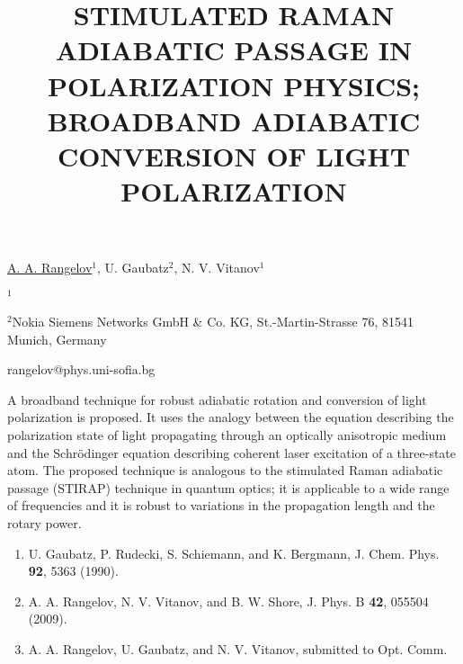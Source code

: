 \title{STIMULATED RAMAN ADIABATIC PASSAGE IN POLARIZATION PHYSICS; BROADBAND ADIABATIC CONVERSION OF LIGHT POLARIZATION}

\underline{A. A. Rangelov}$^{1}$, U. Gaubatz$^{2}$, N. V.
Vitanov$^{1}$  

{\normalsize{

\vspace{-4mm} $^1$\unisofia

\vspace{-4mm} $^2$Nokia Siemens Networks GmbH \& Co. KG,
St.-Martin-Strasse 76, 81541 Munich, Germany

\email rangelov@phys.uni-sofia.bg}}

A broadband technique for robust adiabatic rotation and conversion
of light polarization is proposed. It uses the analogy between the
equation describing the polarization state of light propagating
through an optically anisotropic medium and the Schr\"{o}dinger
equation describing coherent laser excitation of a three-state atom.
The proposed technique is analogous to the stimulated Raman
adiabatic passage (STIRAP) technique in quantum optics;
 it is applicable to a wide range of frequencies and it is robust to variations in the propagation length and the rotary power.


\begin{enumerate}
\item U. Gaubatz, P. Rudecki, S. Schiemann, and K. Bergmann, J. Chem. Phys. \textbf{92}, 5363 (1990).
\item A. A. Rangelov, N. V. Vitanov, and B. W. Shore, J. Phys. B \textbf{42}, 055504 (2009).
\item A. A. Rangelov, U. Gaubatz, and N. V. Vitanov, submitted to Opt. Comm.
\end{enumerate}

\vspace{\baselineskip}

